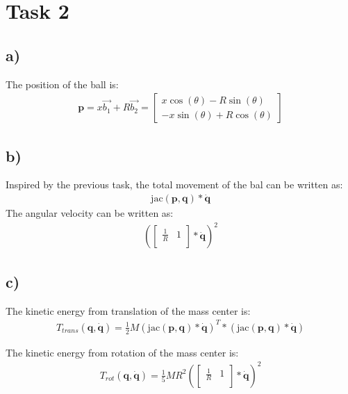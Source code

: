 \documentclass{article}
\begin{document}
\newpage
\section*{Task 2}
\subsection*{a)}

The position of the ball is:
\begin{align*}
    \boldsymbol p = x \vec{b_1} + R \vec{b_2} =
    \begin{bmatrix}
        x \cos(\theta) -R \sin(\theta) \\
        -x \sin(\theta) +R \cos(\theta)
    \end{bmatrix}
\end{align*}

\subsection*{b)}
Inspired by the previous task, the total movement of the bal can be written as:
\begin{align*}
    \text{jac}(\boldsymbol p, \boldsymbol q) * \boldsymbol{\dot q}
\end{align*}
The angular velocity can be written as:
\begin{align*}
    (
    \begin{bmatrix}
        \frac{1}{R} & 1 \\
    \end{bmatrix}
    *\boldsymbol {\dot q}
    )^2
\end{align*}
\subsection*{c)}
The kinetic energy from translation of the mass center is:
\begin{align*}
    T_{trans}(\boldsymbol q, \boldsymbol {\dot q})
    =
    \frac{1}{2} M
    (\text{jac}(\boldsymbol p, \boldsymbol q) * \boldsymbol{\dot q})^T
    *
    (\text{jac}(\boldsymbol p, \boldsymbol q) * \boldsymbol{\dot q})
\end{align*}

The kinetic energy from rotation of the mass center is:
\begin{align*}
    T_{rot}(\boldsymbol q, \boldsymbol {\dot q})
    = \frac{1}{5}M R^2
    (
    \begin{bmatrix}
        \frac{1}{R} & 1 \\
    \end{bmatrix}
    *\boldsymbol {\dot q}
    )^2
\end{align*}
\end{document}
